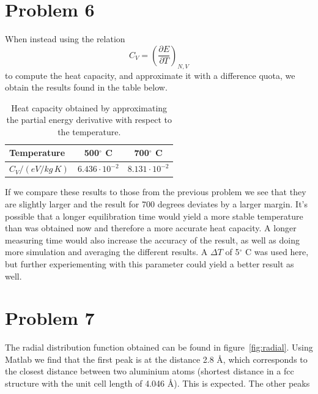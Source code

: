 \section*{Problem 6}

When instead using the relation
\begin{equation}
	C_V = \left( \frac{\partial E}{\partial T} \right)_{N,V}
\end{equation}
to compute the heat capacity, and approximate it with a difference quota, we obtain the results found in the table below.

\begin{table}[h!]
	\centering	
	\caption{Heat capacity obtained by approximating the partial energy derivative with respect to the temperature.}
	\begin{tabular}{l|cc}
		\hline \textbf{Temperature} & \textbf{500$^\circ$ C} & \textbf{700$^\circ$ C} \\ \hline
		$C_V / (\unit{eV/kg\,K})$ & $6.436 \cdot 10^{-2}$ & $8.131 \cdot 10^{-2}$ \\ \hline
	\end{tabular}
	\label{tab:prob6}
\end{table}

If we compare these results to those from the previous problem we see that they are slightly larger and the result for 700 degrees deviates by a larger margin. It's possible that a longer equilibration time would yield a more stable temperature than was obtained now and therefore a more accurate heat capacity. A longer measuring time would also increase the accuracy of the result, as well as doing more simulation and averaging the different results. A $\Delta T$ of 5$^\circ$ C was used here, but further experiementing with this parameter could yield a better result as well.

\section*{Problem 7}

The radial distribution function obtained can be found in figure~\ref{fig:radial}. Using Matlab we find that the first peak is at the distance 2.8 \r{A}, which corresponds to the closest distance between two aluminium atoms (shortest distance in a fcc structure with the unit cell length of 4.046 \r{A}). This is expected. The other peaks


